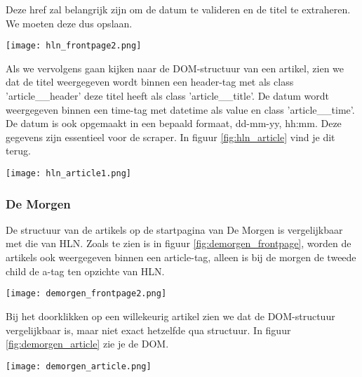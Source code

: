 Deze href zal belangrijk zijn om de datum te valideren en de titel te extraheren. We moeten deze dus opslaan. 

\begin{center}
    \texttt{[image: hln\_frontpage2.png]}
    \label{fig:hln_frontpage}
\end{center}

Als we vervolgens gaan kijken naar de DOM-structuur van een artikel, zien we dat de titel weergegeven wordt binnen een header-tag met als class 'article\_\_header' deze titel heeft als class 'article\_\_title'. De datum wordt weergegeven binnen een time-tag met datetime als value en class 'article\_\_time'. De datum is ook opgemaakt in een bepaald formaat, dd-mm-yy, hh:mm. Deze gegevens zijn essentieel voor de scraper. In figuur \ref{fig:hln_article} vind je dit terug. \\

\begin{center}
    \texttt{[image: hln\_article1.png]}
    \label{fig:hln_article}
\end{center}

\subsubsection{De Morgen}
De structuur van de artikels op de startpagina van De Morgen is vergelijkbaar met die van HLN. Zoals te zien is in figuur \ref{fig:demorgen_frontpage}, worden de artikels ook weergegeven binnen een article-tag, alleen is bij de morgen de tweede child de a-tag ten opzichte van HLN.

\begin{center}
    \texttt{[image: demorgen\_frontpage2.png]}
    \label{fig:demorgen_frontpage}
\end{center}

Bij het doorklikken op een willekeurig artikel zien we dat de DOM-structuur vergelijkbaar is, maar niet exact hetzelfde qua structuur. In figuur \ref{fig:demorgen_article} zie je de DOM.

\begin{center}
    \texttt{[image: demorgen\_article.png]}
    \label{fig:demorgen_article} 
\end{center}

